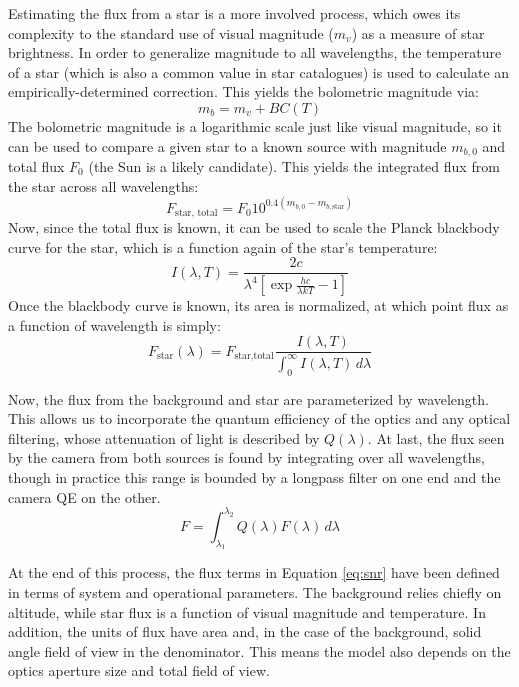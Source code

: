 \documentclass[twocolumn,letterpaper]{IEEEAerospace2012}
\newcommand{\parens} [1] {\left(  #1  \right)}
\newcommand{\brackets} [1] {\left[ #1 \right]}
\newcommand{\BC}{\mathit{BC}}
\newcommand{\sub}[1]{\text{#1}} %
\begin{document}
Estimating the flux from a star is a more involved process, which owes its complexity to the standard use of visual magnitude ($m_v$) as a measure of star brightness. In order to generalize magnitude to all wavelengths, the temperature of a star (which is also a common value in star catalogues) is used to calculate an empirically-determined correction. %
This yields the bolometric magnitude via:
\begin{equation}
    \label{eq:bolometric}
    m_b = m_v + \BC (T)
\end{equation}
The bolometric magnitude is a logarithmic scale just like visual magnitude, so it can be used to compare a given star to a known source with magnitude $m_{b,0}$ and total flux $F_0$ (the Sun is a likely candidate). This yields the integrated flux from the star across all wavelengths:
\begin{equation}
    \label{eq:totalflux}
    F_{\sub{star, total}} = F_0 10^{0.4 \parens{m_{b,0} - m_{b,\sub{star}}}}
\end{equation}
Now, since the total flux is known, it can be used to scale the Planck blackbody curve for the star, which is a function again of the star's temperature:
\begin{equation}
    \label{eq:planck}
    I(\lambda, T) = \frac{2c}{\lambda^4 \brackets{\exp{\frac{hc}{\lambda k T}} - 1}}
\end{equation}
Once the blackbody curve is known, its area is normalized, at which point flux as a function of wavelength is simply:
\begin{equation}
    \label{eq:flux}
    F_{\sub{star}}(\lambda) = F_{\sub{star,total}}\frac{I(\lambda,T)}{\int_0^\infty I(\lambda,T) \, d\lambda}
\end{equation}

Now, the flux from the background and star are parameterized by wavelength. This allows us to incorporate the quantum efficiency of the optics and any optical filtering, whose attenuation of light is described by $Q(\lambda)$. At last, the flux seen by the camera from both sources is found by integrating over all wavelengths, though in practice this range is bounded by a longpass filter on one end and the camera QE on the other. 
\begin{equation}
    \label{eq:totalfluxes}
    F = \int_{\lambda_1}^{\lambda_2} Q(\lambda) F(\lambda) \, d\lambda 
\end{equation}

At the end of this process, the flux terms in Equation \ref{eq:snr} have been defined in terms of system and operational parameters. The background relies chiefly on altitude, while star flux is a function of visual magnitude and temperature. In addition, the units of flux have area and, in the case of the background, solid angle field of view in the denominator. This means the model also depends on the optics aperture size and total field of view.  
\end{document}
